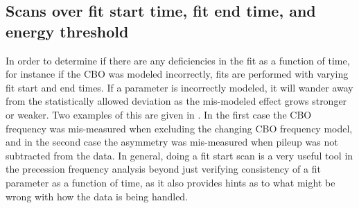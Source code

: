 



\subsection{Scans over fit start time, fit end time, and energy threshold}


In order to determine if there are any deficiencies in the fit as a function of time, for instance if the CBO was modeled incorrectly, fits are performed with varying fit start and end times. If a parameter is incorrectly modeled, it will wander away from the statistically allowed deviation as the mis-modeled effect grows stronger or weaker. Two examples of this are given in . In the first case the CBO frequency was mis-measured when excluding the changing CBO frequency model, and in the second case the asymmetry was mis-measured when pileup was not subtracted from the data. In general, doing a fit start scan is a very useful tool in the precession frequency analysis beyond just verifying consistency of a fit parameter as a function of time, as it also provides hints as to what might be wrong with how the data is being handled.


